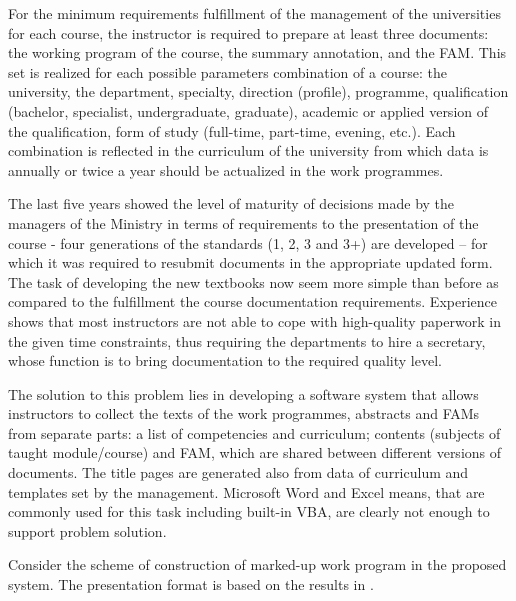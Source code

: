 \documentclass[12pt]{llncs}
\begin{document}
For the minimum requirements fulfillment of the management of the
universities for each course, the instructor is required to prepare at
least three documents: the working program of the course, the summary
annotation, and the FAM. This set is realized for each possible
parameters combination of a course: the university, the department,
specialty, direction (profile), programme, qualification (bachelor,
specialist, undergraduate, graduate), academic or applied version of the
qualification, form of study (full-time, part-time, evening, etc.). Each
combination is reflected in the curriculum of the university from which
data is annually or twice a year should be actualized in the work
programmes.

The last five years showed the level of maturity of decisions made by
the managers of the Ministry in terms of requirements to the
presentation of the course - four generations of the standards (1, 2, 3
and 3+) are developed -- for which it was required to resubmit documents
in the appropriate updated form. The task of developing the new
textbooks now seem more simple than before as compared to the
fulfillment the course documentation requirements. Experience shows that
most instructors are not able to cope with high-quality paperwork in the
given time constraints, thus requiring the departments to hire a
secretary, whose function is to bring documentation to the required
quality level.

The solution to this problem lies in developing a software system that
allows instructors to collect the texts of the work programmes,
abstracts and FAMs from separate parts: a list of competencies and
curriculum; contents (subjects of taught module/course) and FAM, which
are shared between different versions of documents. The title pages are
generated also from data of curriculum and templates set by the
management. Microsoft Word and Excel means, that are commonly used for
this task including built-in VBA, are clearly not enough to support
problem solution.

Consider the scheme of construction of marked-up work program in the
proposed system. The presentation format is based on the results in
\cite{b4,b15}.
\end{document}

